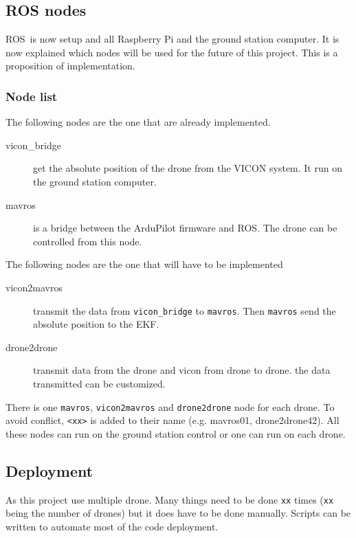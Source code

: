 \subsection{ROS nodes}
ROS is now setup and all Raspberry Pi and the ground station computer.
It is now explained which nodes will be used for the future of this project.
This is a proposition of implementation.

\subsubsection{Node list}

The following nodes are the one that are already implemented.

\begin{description}
    \item[vicon\_bridge] get the absolute position of the drone from the VICON system.
          It run on the ground station computer.
    \item[mavros] is a bridge between the ArduPilot firmware and ROS.
          The drone can be controlled from this node.
\end{description}

The following nodes are the one that will have to be implemented

\begin{description}
    \item[vicon2mavros] transmit the data from \texttt{vicon\_bridge} to \texttt{mavros}.
          Then \texttt{mavros} send the absolute position to the EKF.
    \item[drone2drone] transmit data from the drone and vicon from drone to drone.
          the data transmitted can be customized.
\end{description}

There is one \texttt{mavros}, \texttt{vicon2mavros} and \texttt{drone2drone}
node for each drone. To avoid conflict, \texttt{<xx>} is added to their name (e.g. mavros01, drone2drone42).
All these nodes can run on the ground station control or one can run on each drone.

\subsection{Deployment}
As this project use multiple drone. Many things need to be done \texttt{xx} times (\texttt{xx} being the number of drones) but it does have to be done manually.
Scripts can be written to automate most of the code deployment.

